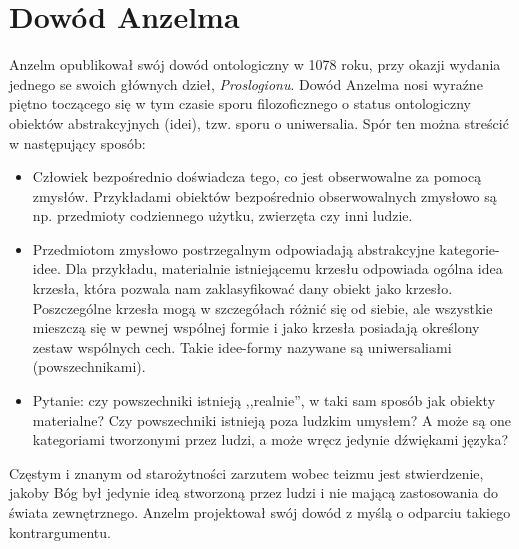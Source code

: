 \documentclass{eiti-raport}
\begin{document}
\section{Dowód Anzelma}
Anzelm opublikował swój dowód ontologiczny w 1078 roku, przy okazji wydania jednego se swoich głównych dzieł, \textit{Proslogionu}. Dowód Anzelma nosi wyraźne piętno toczącego się w tym czasie sporu filozoficznego o status ontologiczny obiektów abstrakcyjnych (idei), tzw. sporu o uniwersalia. Spór ten można streścić w następujący sposób:
\begin{itemize}
	\item Człowiek bezpośrednio doświadcza tego, co jest obserwowalne za pomocą zmysłów. Przykładami obiektów bezpośrednio obserwowalnych zmysłowo są np. przedmioty codziennego użytku, zwierzęta czy inni ludzie. 
	\item Przedmiotom zmysłowo postrzegalnym odpowiadają abstrakcyjne kategorie-idee. Dla przykładu, materialnie istniejącemu krzesłu odpowiada ogólna idea krzesła, która pozwala nam zaklasyfikować dany obiekt jako krzesło. Poszczególne krzesła mogą w szczegółach różnić się od siebie, ale wszystkie mieszczą się w pewnej wspólnej formie i jako krzesła posiadają określony zestaw wspólnych cech. Takie idee-formy nazywane są uniwersaliami (powszechnikami). 
	\item Pytanie: czy powszechniki istnieją ,,realnie'', w taki sam sposób jak obiekty materialne? Czy powszechniki istnieją poza ludzkim umysłem? A może są one kategoriami tworzonymi przez ludzi, a może wręcz jedynie dźwiękami języka?
\end{itemize}
Częstym i znanym od starożytności zarzutem wobec teizmu jest stwierdzenie, jakoby Bóg był jedynie ideą stworzoną przez ludzi i nie mającą zastosowania do świata zewnętrznego. Anzelm projektował swój dowód z myślą o odparciu takiego kontrargumentu. 
\end{document}
